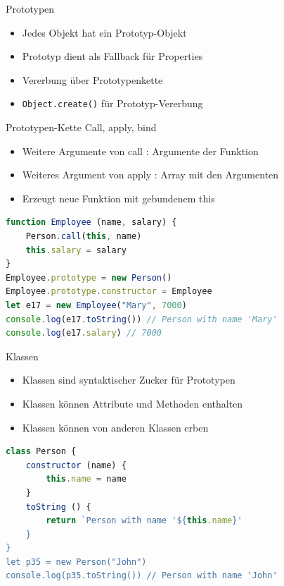 \begin{concept}{Prototypen}
    \begin{itemize}
        \item Jedes Objekt hat ein Prototyp-Objekt
        \item Prototyp dient als Fallback für Properties
        \item Vererbung über Prototypenkette
        \item \texttt{Object.create()} für Prototyp-Vererbung
    \end{itemize}
\end{concept}

\begin{concept}{Prototypen-Kette}
    Call, apply, bind
    \begin{itemize}
        \item Weitere Argumente von call : Argumente der Funktion
        \item Weiteres Argument von apply : Array mit den Argumenten
        \item Erzeugt neue Funktion mit gebundenem this
    \end{itemize}
\begin{lstlisting}[language=JavaScript, style=basesmol]
function Employee (name, salary) {
    Person.call(this, name)
    this.salary = salary
}
Employee.prototype = new Person()
Employee.prototype.constructor = Employee
let e17 = new Employee("Mary", 7000)
console.log(e17.toString()) // Person with name 'Mary' 
console.log(e17.salary) // 7000 
\end{lstlisting}
\end{concept}

\begin{definition}{Klassen}
    \begin{itemize}
        \item Klassen sind syntaktischer Zucker für Prototypen
        \item Klassen können Attribute und Methoden enthalten
        \item Klassen können von anderen Klassen erben
    \end{itemize}
\begin{lstlisting}[language=JavaScript, style=basesmol]
class Person {
    constructor (name) {
        this.name = name
    }
    toString () {
        return `Person with name '${this.name}'
    }
}
let p35 = new Person("John")
console.log(p35.toString()) // Person with name 'John'
\end{lstlisting}
\end{definition}

